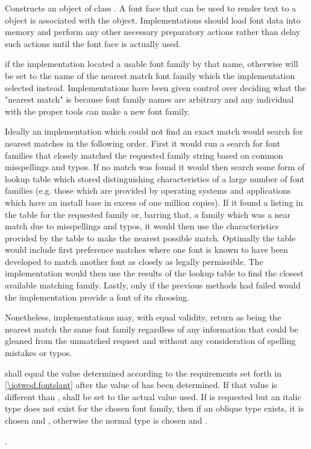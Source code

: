 \begin{itemdescr}
	\pnum
	\effects
	Constructs an object of class . A font face that can be used to render text to a  object is associated with the object. Implementations should load font data into memory and perform any other necessary preparatory actions rather than delay such actions until the font face is actually used.
	
	\pnum
	\postconditions
	 if the implementation located a usable font family by that name, otherwise  will be set to the name of the  nearest match font family which the implementation selected instead.
	\enternote
	Implementations have been given control over deciding what the "nearest match" is because font family names are arbitrary and any individual with the proper tools can make a new font family.
	
	Ideally an implementation which could not find an exact match would search for nearest matches in the following order. First it would run a search for font families that closely matched the requested family string based on common misspellings and typos. If no match was found it would then search some form of lookup table which stored distinguishing characteristics of a large number of font families (e.g. those which are provided by operating systems and applications which have an install base in excess of one million copies). If it found a listing in the table for the requested family or, barring that, a family which was a near match due to misspellings and typos, it would then use the characteristics provided by the table to make the nearest possible match. Optimally the table would include first preference matches where one font is known to have been developed to match another font as closely as legally permissible. The implementation would then use the results of the lookup table to find the closest available matching family. Lastly, only if the previous methods had failed would the implementation provide a font of its choosing.
	
	Nonetheless, implementations may, with equal validity, return as being the nearest match the same font family regardless of any information that could be gleaned from the unmatched request and without any consideration of spelling mistakes or typos.
	\exitnote
	
	\pnum
	 shall equal the value determined according to the requirements set forth in \ref{\iotwod.fontslant} after the value of  has been determined. If that  value is different than ,  shall be set to the actual value used.
	\enterexample
	If  is requested but an italic type does not exist for the chosen font family, then if an oblique type exists, it is chosen and , otherwise the normal type is chosen and .
	\exitexample
	
	\pnum
	.
\end{itemdescr}

